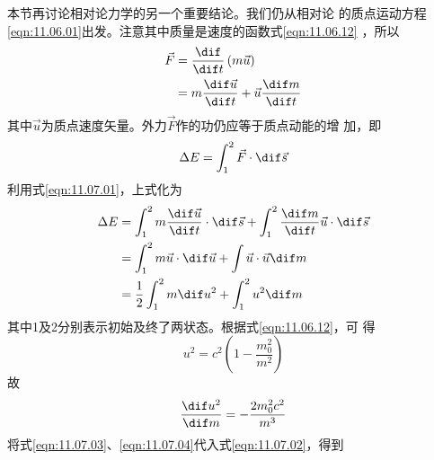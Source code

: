 \documentclass[../outline-of-mechanics.tex]{subfiles}
\begin{document}
\section[质能关系]{}\label{sec:11.07}

本节再讨论相对论力学的另一个重要结论。我们仍从相对论
的质点运动方程\eqref{eqn:11.06.01}出发。注意其中质量是速度的函数式\lhbrak \eqref{eqn:11.06.12} \rhbrak ，所以
\begin{equation}\label{eqn:11.07.01}
  \begin{split}
    \vec{F} &= \frac { \dif } { \dif t } \left( m \vec{u} \right) \\
    &= m \frac { \dif \vec{u} } { \dif t } + \vec{u} \frac { \dif m } { \dif t }
  \end{split}
\end{equation}
其中$ \vec{u} $为质点速度矢量。外力$\vec{F}$作的功仍应等于质点动能的增
加，即
\begin{equation*}
  \Delta E = \int _ 1 ^ 2 \vec{F} \cdot \dif \vec{s}
\end{equation*}
利用式\eqref{eqn:11.07.01}，上式化为
\begin{equation}\label{eqn:11.07.02}
  \begin{aligned}
    \Delta E & =\int_{1}^{2} m \frac{ \dif \vec{u}}{ \dif t} \cdot \dif \vec{s}+\int_{1}^{2} \frac{ \dif m}{ \dif t} \vec{u } \cdot \dif \vec{s} \\
             & =\int_{1}^{2} m \vec{u} \cdot \dif \vec{u}+\int \vec{u} \cdot \vec{u} \dif m                                                      \\
             & =\frac{1}{2} \int_{1}^{2} m \dif u^{2}+\int_{1}^{2} u^{2} \dif m
  \end{aligned}
\end{equation}
其中1及2分别表示初始及终了两状态。根据式\eqref{eqn:11.06.12}，可
得
\begin{equation}\label{eqn:11.07.03}
  u ^ { 2 } = c ^ { 2 } \left( 1 - \frac { m _ { 0 } ^ { 2 } } { m ^ { 2 } } \right)
\end{equation}
故
\begin{equation}\label{eqn:11.07.04}
  \frac{ \dif u^{2}}{ \dif m}=-\frac{2 m_{0}^{2} c^{2}}{m^{3}}
\end{equation}
将式\eqref{eqn:11.07.03}、\eqref{eqn:11.07.04}代入式\eqref{eqn:11.07.02}，得到
\end{document}
